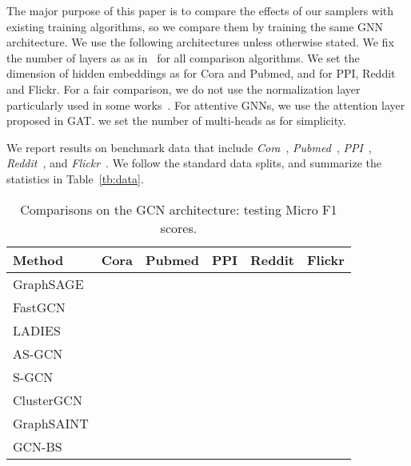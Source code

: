 \documentclass{article}
\begin{document}
The major purpose of this paper is to compare the effects
of our samplers with existing training algorithms, so 
we compare them by training the same GNN architecture.
We use the following architectures unless otherwise stated.
We fix the number of layers as  as 
in~\cite{kipf2016semi} for all comparison algorithms.
We set the dimension of hidden embeddings as  for Cora and Pubmed,
and  for PPI, Reddit and Flickr. For a fair comparison, we 
do not use the normalization layer~\cite{ba2016layer}
particularly used in some 
works~\cite{chen2017stochastic,zeng2019graphsaint}.
For attentive GNNs, we use the attention layer proposed 
in GAT. we set the number of multi-heads 
as  for simplicity. 

We report results on  benchmark data that include
\textit{Cora}~\cite{sen2008collective}, 
\textit{Pubmed}~\cite{sen2008collective},
\textit{PPI}~\cite{hamilton2017inductive},
\textit{Reddit}~\cite{hamilton2017inductive},
and \textit{Flickr}~\cite{zeng2019graphsaint}.
We follow the standard data splits,
and summarize the statistics in Table~\ref{tb:data}.

{\tiny
\begin{table*}[h]
\caption{Comparisons on the GCN architecture: testing Micro F1 scores.}
\label{tb:bench-gcn}
\begin{center}
\begin{tabular}{llllll}
\toprule
\textbf{Method}  &\textbf{Cora} &\textbf{Pubmed} &\textbf{PPI}& \textbf{Reddit}& \textbf{Flickr} \\
\midrule
GraphSAGE &  & &  &  &  \\
FastGCN &  & &  &  &  \\
LADIES &  & &  &  &  \\
AS-GCN &  & &  &  &  \\
S-GCN &  & &  &  &  \\
ClusterGCN &  & &  &  &  \\
GraphSAINT &  & &  &  &  \\
\midrule
GCN-BS &  & &  &  &  \\
\bottomrule
\end{tabular}
\end{center}
\end{table*}
}
\end{document}
